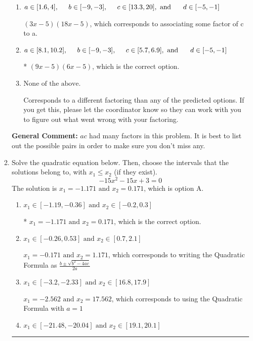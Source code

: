 \documentclass{extbook}[14pt]
\newcommand{\litem}[1]{\item #1

\rule{\textwidth}{0.4pt}}
\begin{document}
\begin{enumerate}
{\begin{enumerate}[label=\Alph*.]
 $(18x -5)(3x -5)$, which corresponds to associating some factor of a to c.
\item \( a \in [1.6, 4], \hspace*{5mm} b \in [-9, -3], \hspace*{5mm} c \in [13.3, 20], \text{ and } \hspace*{5mm} d \in [-5, -1] \)

 $(3x -5)(18x -5)$, which corresponds to associating some factor of c to a.
\item \( a \in [8.1, 10.2], \hspace*{5mm} b \in [-9, -3], \hspace*{5mm} c \in [5.7, 6.9], \text{ and } \hspace*{5mm} d \in [-5, -1] \)

* $(9x -5)(6x -5)$, which is the correct option.
\item \( \text{None of the above.} \)

 Corresponds to a different factoring than any of the predicted options. If you get this, please let the coordinator know so they can work with you to figure out what went wrong with your factoring.
\end{enumerate}

\textbf{General Comment:} $ac$ had many factors in this problem. It is best to list out the possible pairs in order to make sure you don't miss any.
}
\litem{
Solve the quadratic equation below. Then, choose the intervals that the solutions belong to, with $x_1 \leq x_2$ (if they exist).
\[ -15x^{2} -15 x + 3 = 0 \]
The solution is \( x_1 = -1.171 \text{ and } x_2 = 0.171 \), which is option A.\begin{enumerate}[label=\Alph*.]
\item \( x_1 \in [-1.19, -0.36] \text{ and } x_2 \in [-0.2, 0.3] \)

* $x_1 = -1.171 \text{ and } x_2 = 0.171$, which is the correct option.
\item \( x_1 \in [-0.26, 0.53] \text{ and } x_2 \in [0.7, 2.1] \)

 $x_1 = -0.171 \text{ and } x_2 = 1.171$, which corresponds to writing the Quadratic Formula as $\frac{b \pm \sqrt{b^2 - 4ac}}{2a}$
\item \( x_1 \in [-3.2, -2.33] \text{ and } x_2 \in [16.8, 17.9] \)

 $x_1 = -2.562 \text{ and } x_2 = 17.562$, which corresponds to using the Quadratic Formula with $a=1$
\item \( x_1 \in [-21.48, -20.04] \text{ and } x_2 \in [19.1, 20.1] \)


\end{enumerate}}
\end{enumerate}
\end{document}
